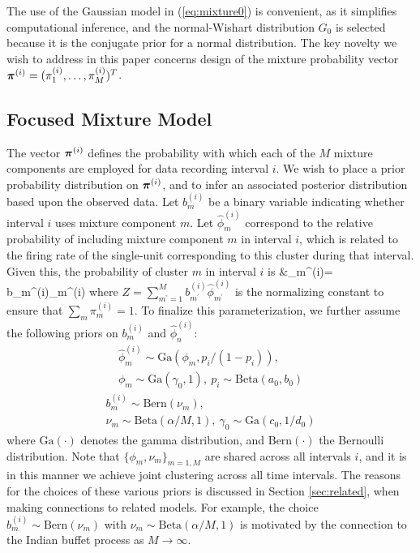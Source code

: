 \documentclass[journal]{IEEEtran}
\begin{document}
The use of the Gaussian model in (\ref{eq:mixture0}) is convenient, as it simplifies computational inference, and the normal-Wishart distribution $G_0$ is selected because it is the conjugate prior for a normal distribution. The key novelty we wish to address in this paper concerns design of the mixture probability vector $\boldsymbol{\pi}^{(i)}=(\pi_1^{(i)},\dots,\pi_{M}^{(i)})^T$.%


\subsection{{Focused Mixture Model}\label{sec:focused}}

{The vector $\boldsymbol{\pi}^{(i)}$ defines the probability with which each of the $M$ mixture components are employed for data recording interval $i$. We wish to place a prior probability distribution on $\boldsymbol{\pi}^{(i)}$, and to infer an associated posterior distribution based upon the observed data. Let $b_m^{(i)}$ be a binary variable indicating whether interval $i$ uses mixture component $m$.  Let $\hat{\phi}_m^{(i)}$ correspond to the relative probability of including mixture component $m$ in interval $i$, which is related to the firing rate of the single-unit corresponding to this cluster during that interval.  Given this, the probability of cluster $m$ in interval $i$ is}
\beqs %
&\pi_m^{(i)}=  b_m^{(i)}\hat{\phi}_m^{(i)} 
\label{eq:mixt}\eeqs 
{where $Z=\sum_{m^\prime=1}^M b_{m^\prime}^{(i)}\hat{\phi}_{m^\prime}^{(i)}$ is the normalizing constant to ensure that $\sum_m \pi_m^{(i)}=1$.  To finalize this parameterization, we further assume the following priors on $b_m^{(i)}$ and $\hat{\phi}_n^{(i)}$:}
\begin{multline} \label{eq:gen1}
\hat{\phi}_m^{(i)}\sim \mbox{Ga}(\phi_m,p_i/(1-p_i)), \\
\phi_m\sim\mbox{Ga}(\gamma_0,1) ,~p_i\sim\mbox{Beta}(a_0,b_0)
\end{multline}
\begin{multline} \label{eq:gen2}
b_m^{(i)}\sim\mbox{Bern}(\nu_m), \\
\nu_m\sim\mbox{Beta}(\alpha/M,1),~\gamma_0\sim\mbox{Ga}(c_0,1/d_0)
\end{multline}
where $\mbox{Ga}(\cdot)$ denotes the gamma distribution, and $\mbox{Bern}(\cdot)$ the Bernoulli distribution. Note that $\{\phi_m,\nu_m\}_{m=1,M}$ are shared across all intervals $i$, and it is in this manner we achieve joint clustering across all {time} intervals. 
The reasons for the choices of these various priors is discussed in Section \ref{sec:related}, when making connections to related models. For example, the choice $b_m^{(i)}\sim\mbox{Bern}(\nu_m)$ with $\nu_m\sim\mbox{Beta}(\alpha/M,1)$ is motivated by the connection to the Indian buffet process \cite{IBP} as $M\rightarrow\infty$.
\end{document}
